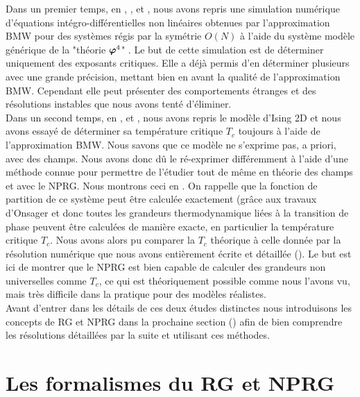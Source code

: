 \documentclass[10.5pt]{article}
\begin{document}
\begin{multicols*}{2}
Dans un premier temps, en , , et , nous avons repris une simulation numérique d'équations intégro-différentielles non linéaires obtenues par l'approximation BMW pour des systèmes régis par la symétrie $O(N)$ à l'aide du système modèle générique de la "théorie $\boldsymbol{ \varphi}^4$" \cite{LeonardThesis}. Le but de cette simulation est de déterminer uniquement des exposants critiques. Elle a déjà permis d'en déterminer plusieurs avec une grande précision, mettant bien en avant la qualité de l'approximation BMW. Cependant elle peut présenter des comportements étranges et des résolutions instables que nous avons tenté d'éliminer. \\

Dans un second temps, en ,  et , nous avons repris le modèle d'Ising 2D et nous avons essayé de déterminer sa température critique $T_c$ toujours à l'aide de l'approximation BMW. Nous savons que ce modèle ne s'exprime pas, a priori, avec des champs. Nous avons donc dû le ré-exprimer différemment à l'aide d'une méthode connue pour permettre de l'étudier tout de même en théorie des champs et avec le NPRG. Nous montrons ceci en . On rappelle que la fonction de partition de ce système peut être calculée exactement (grâce aux travaux d'Onsager \cite{Onsager} et donc toutes les grandeurs thermodynamique liées à la transition de phase peuvent être calculées de manière exacte, en particulier la température critique $T_c$. Nous avons alors pu comparer la $T_c$ théorique à celle donnée par la résolution numérique que nous avons entièrement écrite et détaillée (). Le but est ici de montrer que le NPRG est bien capable de calculer des grandeurs non universelles comme $T_c$, ce qui est théoriquement possible comme nous l'avons vu, mais très difficile dans la pratique pour des modèles réalistes.\\


Avant d'entrer dans les détails de ces deux études distinctes nous introduisons les concepts de RG et NPRG dans la prochaine section () afin de bien comprendre les résolutions détaillées par la suite et utilisant ces méthodes.

\newpage

\section{Les formalismes du RG et NPRG}


\end{multicols*}
\end{document}
